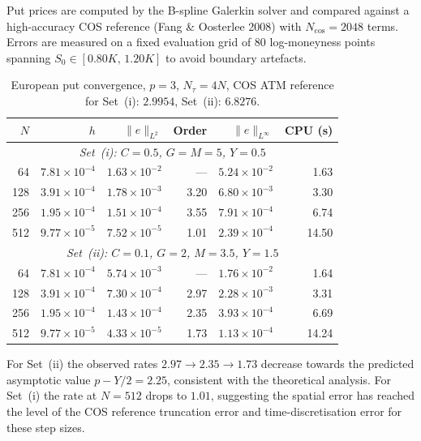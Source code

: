 \documentclass[11pt,a4paper]{article}
\begin{document}
Put prices are computed by the B-spline Galerkin solver and compared against
a high-accuracy COS reference (Fang \& Oosterlee 2008) with $N_{\cos}=2048$
terms. Errors are measured on a fixed evaluation grid of 80 log-moneyness
points spanning $S_0\in[0.80K,\,1.20K]$ to avoid boundary artefacts.

\begin{table}[ht]
\centering
\caption{European put convergence, $p=3$, $N_\tau=4N$,
         COS ATM reference for Set~(i): $2.9954$, Set~(ii): $6.8276$.}
\label{tab:put_convergence}
\begin{tabular}{rrrrrr}
\toprule
$N$ & $h$ & $\|e\|_{L^2}$ & Order & $\|e\|_{L^\infty}$ & CPU (s) \\
\midrule
\multicolumn{6}{c}{\textit{Set~(i): $C=0.5$, $G=M=5$, $Y=0.5$}} \\[2pt]
 64  & $7.81\times10^{-4}$ & $1.63\times10^{-2}$ & ---  & $5.24\times10^{-2}$ & 1.63 \\
128  & $3.91\times10^{-4}$ & $1.78\times10^{-3}$ & 3.20 & $6.80\times10^{-3}$ & 3.30 \\
256  & $1.95\times10^{-4}$ & $1.51\times10^{-4}$ & 3.55 & $7.91\times10^{-4}$ & 6.74 \\
512  & $9.77\times10^{-5}$ & $7.52\times10^{-5}$ & 1.01 & $2.39\times10^{-4}$ & 14.50 \\
\midrule
\multicolumn{6}{c}{\textit{Set~(ii): $C=0.1$, $G=2$, $M=3.5$, $Y=1.5$}} \\[2pt]
 64  & $7.81\times10^{-4}$ & $5.74\times10^{-3}$ & ---  & $1.76\times10^{-2}$ & 1.64 \\
128  & $3.91\times10^{-4}$ & $7.30\times10^{-4}$ & 2.97 & $2.28\times10^{-3}$ & 3.31 \\
256  & $1.95\times10^{-4}$ & $1.43\times10^{-4}$ & 2.35 & $3.93\times10^{-4}$ & 6.69 \\
512  & $9.77\times10^{-5}$ & $4.33\times10^{-5}$ & 1.73 & $1.13\times10^{-4}$ & 14.24 \\
\bottomrule
\end{tabular}
\end{table}

For Set~(ii) the observed rates $2.97\to2.35\to1.73$ decrease towards the
predicted asymptotic value $p-Y/2 = 2.25$, consistent with the theoretical
analysis. For Set~(i) the rate at $N=512$ drops to $1.01$, suggesting the
spatial error has reached the level of the COS reference truncation error and
time-discretisation error for these step sizes.

\end{document}
